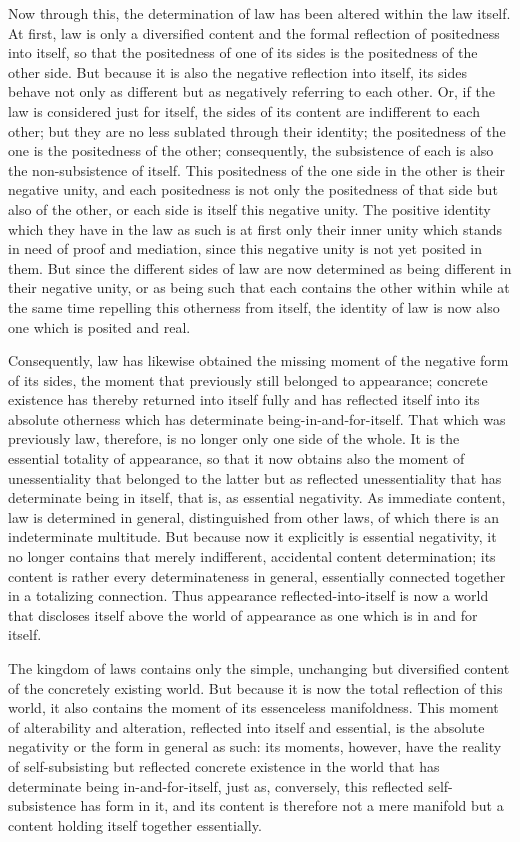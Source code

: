 Now through this, the determination of law
has been altered within the law itself.
At first, law is only a diversified content
and the formal reflection of positedness into itself,
so that the positedness of one of its sides is
the positedness of the other side.
But because it is also the negative reflection into itself,
its sides behave not only as different
but as negatively referring to each other.
Or, if the law is considered just for itself,
the sides of its content are indifferent to each other;
but they are no less sublated through their identity;
the positedness of the one is the positedness of the other;
consequently, the subsistence of each is
also the non-subsistence of itself.
This positedness of the one side in the other
is their negative unity,
and each positedness is not only the positedness
of that side but also of the other,
or each side is itself this negative unity.
The positive identity which they have in the law as such is
at first only their inner unity
which stands in need of proof and mediation,
since this negative unity is not yet posited in them.
But since the different sides of law are now determined
as being different in their negative unity,
or as being such that each contains the other within
while at the same time repelling this otherness from itself,
the identity of law is now also one which is posited and real.

Consequently, law has likewise obtained
the missing moment of the negative form of its sides,
the moment that previously still belonged to appearance;
concrete existence has thereby returned into itself fully
and has reflected itself into its absolute otherness
which has determinate being-in-and-for-itself.
That which was previously law, therefore,
is no longer only one side of the whole.
It is the essential totality of appearance,
so that it now obtains also the moment of
unessentiality that belonged to the latter
but as reflected unessentiality
that has determinate being in itself,
that is, as essential negativity.
As immediate content, law is determined in general,
distinguished from other laws,
of which there is an indeterminate multitude.
But because now it explicitly is essential negativity,
it no longer contains that merely
indifferent, accidental content determination;
its content is rather every determinateness in general,
essentially connected together in a totalizing connection.
Thus appearance reflected-into-itself is
now a world that discloses itself above
the world of appearance as one
which is in and for itself.

The kingdom of laws contains only
the simple, unchanging but diversified content
of the concretely existing world.
But because it is now the total reflection of this world,
it also contains the moment of its essenceless manifoldness.
This moment of alterability and alteration,
reflected into itself and essential,
is the absolute negativity
or the form in general as such:
its moments, however, have  the reality of
self-subsisting but reflected concrete existence
in the world  that has determinate being in-and-for-itself,
just as, conversely, this reflected
self-subsistence has form in it,
and its content is therefore not a mere manifold
but a content holding itself together essentially.

